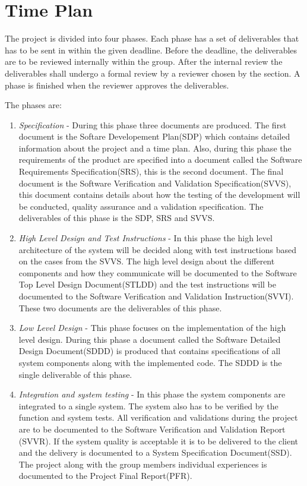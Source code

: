 \documentclass{article}
\begin{document}
\section{Time Plan}
The project is divided into four phases. Each phase has a set of deliverables that has to be sent in within the given deadline. Before the deadline, the deliverables are to be reviewed internally within the group. After the internal review the deliverables shall undergo a formal review by a reviewer chosen by the section. A phase is finished when the reviewer approves the deliverables. 

The phases are:
\begin{enumerate}  
\item  \textit{Specification} - During this phase three documents are produced. The first document is the Softare Developement Plan(SDP) which contains detailed information about the project and a time plan. Also, during this phase the requirements of the product are specified into a document called the Software Requirements Specification(SRS), this is the second document. The final document is the Software Verification and Validation Specification(SVVS), this document contains details about how the testing of the development will be conducted, quality assurance and a validation specification. The deliverables of this phase is the SDP, SRS and SVVS.
\item \textit{High Level Design and Test Instructions} - In this phase the high level architecture of the system will be decided along with test instructions based on the cases from the SVVS. The high level design about the different components and how they communicate will be documented to the Software Top Level Design Document(STLDD) and the test instructions will be documented to the Software Verification and Validation Instruction(SVVI). These two documents are the deliverables of this phase.  
\item \textit{Low Level Design} - This phase focuses on the implementation of the high level design. During this phase a document called the Software Detailed Design Document(SDDD) is produced that contains specifications of all system components along with the implemented code. The SDDD is the single deliverable of this phase.
 \item \textit{Integration and system testing} - In this phase the system components are integrated to a single system. The system also has to be verified by the function and system tests. All verification and validations during the project are to be documented to the Software Verification and Validation Report (SVVR). If the system quality is acceptable it is to be delivered to the client and the delivery is documented to a System Specification Document(SSD). The project along with the group members individual experiences is documented to the Project Final Report(PFR).  
\end{enumerate}
\end{document}
